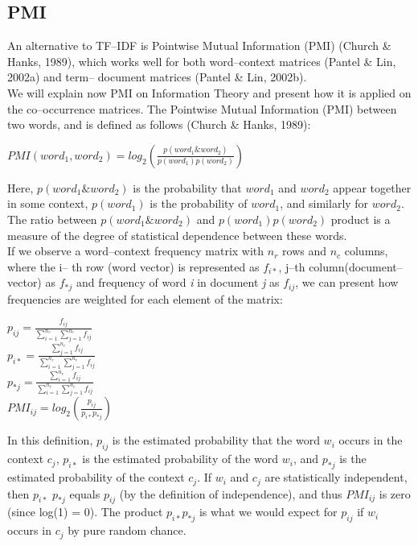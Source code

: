 \subsection{PMI}\label{pmi}
An alternative to TF--IDF is Pointwise Mutual Information (PMI) (Church \& Hanks, 1989), 
which works well for both word--context matrices (Pantel \& Lin, 2002a)\cite{pantelLin2002} and term--
document matrices (Pantel \& Lin, 2002b).  
\\We will explain now PMI on Information Theory and present how it is applied on the co--occurrence 
matrices. The Pointwise Mutual Information (PMI) between two words, and is defined as follows (Church 
\& Hanks, 1989):
\begin{center}\large{
$PMI(word_{1}, word_{2}) = log_{2}(\frac{p(word_{1} \& word_{2})}{p(word_{1})p(word_{2})}) $
}
\end{center}
Here, $p(word_{1} \& word_{2})$ is the probability that $word_{1}$ and $word_{2}$ appear together in 
some context,  $p(word_{1})$ is the probability of $word_{1}$, and similarly for $word_{2}$. The ratio 
between $p(word_{1} \& word_{2})$ and $p(word_{1})p(word_{2})$ product  is a measure of the 
degree of statistical dependence between these words. 
\\If we observe a word--context frequency matrix with $n_{r}$ rows and $n_{c}$ columns, where the i--
th row (word vector) is represented as $f_{i*}$, j--th column(document--vector) as $f_{*j}$  and 
frequency of word \textit{i} in document \textit{j} as $f_{ij}$, we can present how frequencies are 
weighted for each element of the matrix:
\begin{center}\LARGE{
$p_{ij} =  \frac{f_{ij}}{ \sum_{i=1}^{n_{r}}\sum_{j=1}^{n_{c}}f_{ij}}  $
\\$p_{i*} =  \frac{ \sum_{j=1}^{n_{c}}f_{ij}}{ \sum_{i=1}^{n_{r}}\sum_{j=1}^{n_{c}}f_{ij}}  $
\\$p_{*j} =  \frac{ \sum_{i=1}^{n_{r}}f_{ij}}{ \sum_{i=1}^{n_{r}}\sum_{j=1}^{n_{c}}f_{ij}}  $
}
\Large{
\\$PMI_{ij}=log_{2}(\frac{p_{ij}}{p_{i*}p_{*j}})  $
}
\end{center}
In this definition, $p_{ij}$ is the estimated probability that the word $w_{i}$ occurs in the context $c_{j}$, $p_{i*}$ is the estimated probability of the word $w_{i}$, and $p_{*j}$ is the estimated probability of the context $c_{j}$. If $w_{i}$ and $c_{j}$ are statistically independent, then  $p_{i*}$ $p_{*j}$ equals $p_{ij}$ (by the definition of independence), and thus  $PMI_{ij}$ is zero (since log(1) = 0). The product $p_{i*}$$p_{*j}$ is what we would expect for $p_{ij}$ if $w_{i}$ occurs in $c_{j}$ by pure random chance. 

